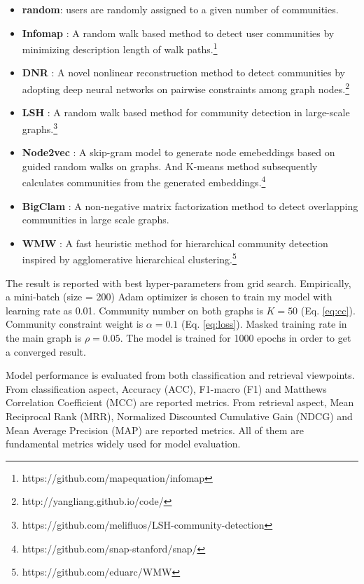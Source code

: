 \begin{itemize}
	\item \textbf{random}: users are randomly assigned to a given number of communities.
	\item \textbf{Infomap} \cite{rosvall2011multilevel}: A random walk based method to detect user communities by minimizing description length of walk paths.\footnote{https://github.com/mapequation/infomap}
	\item \textbf{DNR} \cite{yang2016modularity}: A novel nonlinear reconstruction method to detect communities by adopting deep neural networks on pairwise constraints among graph nodes.\footnote{http://yangliang.github.io/code/}
	\item \textbf{LSH} \cite{chamberlain2018real}: A random walk based method for community detection in large-scale graphs.\footnote{https://github.com/melifluos/LSH-community-detection}
	\item \textbf{Node2vec} \cite{grover2016node2vec}: A skip-gram model to generate node emebeddings based on guided random walks on graphs. And K-means method subsequently calculates communities from the generated embeddings.\footnote{https://github.com/snap-stanford/snap/\label{fn:snap}}
	\item \textbf{BigClam} \cite{yang2013overlapping}: A non-negative matrix factorization method to detect overlapping communities in large scale graphs.
	\item \textbf{WMW} \cite{castrillo2017fast}: A fast heuristic method for hierarchical community detection inspired by agglomerative hierarchical clustering.\footnote{https://github.com/eduarc/WMW} 
\end{itemize}

The result is reported with best hyper-parameters from grid search. Empirically, a mini-batch (size = 200) Adam optimizer is chosen to train my model with learning rate as 0.01. Community number on both graphs is $K = 50$ (Eq. \ref{eq:cc}). Community constraint weight is $\alpha = 0.1$ (Eq. \ref{eq:loss}). Masked training rate in the main graph is $\rho = 0.05$. The model is trained for 1000 epochs in order to get a converged result. 

Model performance is evaluated from both classification and retrieval viewpoints. From classification aspect, Accuracy (ACC), F1-macro (F1) and Matthews Correlation Coefficient (MCC) are reported metrics.
From retrieval aspect, Mean Reciprocal Rank (MRR), Normalized Discounted Cumulative Gain (NDCG) and Mean Average Precision (MAP) are reported metrics. All of them are fundamental metrics widely used for model evaluation.  
